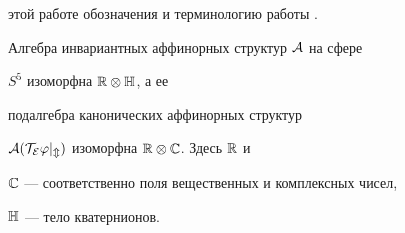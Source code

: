 этой работе обозначения и терминологию работы \cite{Lip}. 


 


\begin{thm} Алгебра инвариантных аффинорных структур $\cal A$ на сфере 


$S^5$ изоморфна $\Bbb R\otimes\Bbb H$, а ее 


подалгебра канонических аффинорных структур 


$\cal A(T_E\varphi|_m)$ изоморфна $\Bbb R\otimes\Bbb C$. Здесь $\Bbb R$ и 


$\Bbb C$ --- соответственно поля вещественных и комплексных чисел, 


$\Bbb H$ --- тело кватернионов. 


\end{thm} 


 


